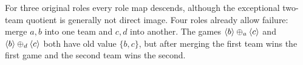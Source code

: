 For three original roles every role map descends, although the exceptional
two-team quotient is generally not direct image. Four roles already allow
failure: merge $a,b$ into one team and $c,d$ into another. The games
$\langle b\rangle\mathbin{\oplus_{a}}\langle c\rangle$ and $\langle b\rangle\mathbin{\oplus_{d}}\langle c\rangle$ both have old value
$\{b,c\}$, but after merging the first team wins the first game and
the second team wins the second.

